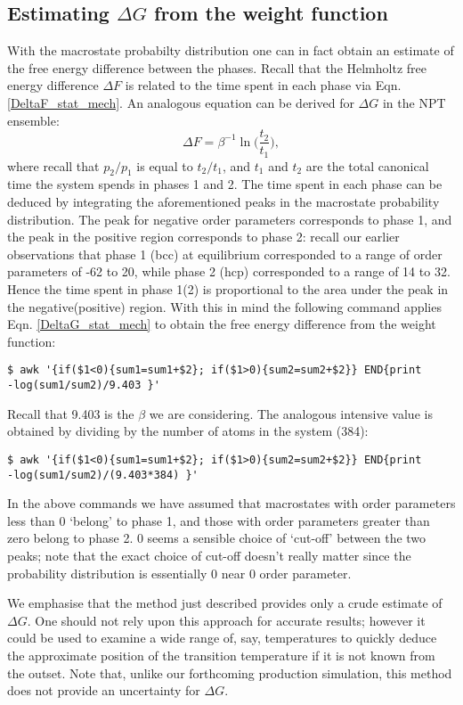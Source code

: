 \documentclass{report}
\begin{document}
\subsection{Estimating $\Delta G$ from the weight function}
With the macrostate probabilty distribution one can in fact obtain an estimate of the free energy difference between the phases. Recall that the
Helmholtz free energy difference $\Delta F$ is related to the time spent in each phase via Eqn. \eqref{DeltaF_stat_mech}. 
An analogous equation can be derived for $\Delta G$ in the NPT ensemble:
\begin{equation}\label{DeltaG_stat_mech}
\Delta F=\beta^{-1}\ln\biggl(\frac{t_2}{t_1}\biggr),
\end{equation}
where recall that $p_2/p_1$ is equal to $t_2/t_1$, and $t_1$ and $t_2$ are the total canonical time the system spends in phases 1 and 2.
The time spent in each phase can be deduced by
integrating the aforementioned peaks in the macrostate probability distribution. The peak for negative order parameters corresponds
to phase 1, and the peak in the positive region corresponds to phase 2: recall our earlier observations that phase 1 (bcc) at equilibrium corresponded to
a range of order parameters of -62 to 20, while phase 2 (hcp) corresponded to a range of 14 to 32. 
Hence the time spent in phase 1(2) is proportional to the area under the peak in the negative(positive) region. With this in mind the following command 
applies Eqn. \eqref{DeltaG_stat_mech} to obtain the free energy difference from the weight function:
\begin{verbatim}
$ awk '{if($1<0){sum1=sum1+$2}; if($1>0){sum2=sum2+$2}} END{print
-log(sum1/sum2)/9.403 }'
\end{verbatim}
Recall that 9.403 is the $\beta$ we are considering. The analogous intensive value is obtained by dividing by the number of atoms in the system (384):
\begin{verbatim}
$ awk '{if($1<0){sum1=sum1+$2}; if($1>0){sum2=sum2+$2}} END{print
-log(sum1/sum2)/(9.403*384) }'
\end{verbatim}
In the above commands we have assumed that macrostates with order parameters less than 0 `belong' to phase 1, and those with order parameters greater
than zero belong to phase 2. 0 seems a sensible choice of `cut-off' between the two peaks; note that the exact choice of cut-off doesn't really matter
since the probability distribution is essentially 0 near 0 order parameter.

We emphasise that the method just described provides only a crude estimate of $\Delta G$. One should not rely upon this approach for accurate results; however
it could be used to examine a wide range of, say, temperatures to quickly deduce the approximate position of the transition temperature if it is not known
from the outset. Note that, unlike our forthcoming production simulation, this method does not provide an uncertainty for $\Delta G$. 
\end{document}
